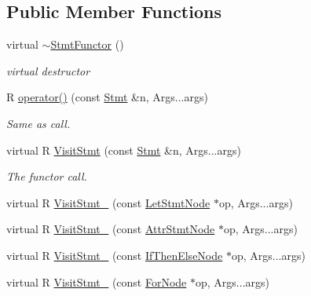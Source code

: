 \subsection*{Public Member Functions}
\begin{DoxyCompactItemize}
\item 
virtual \hyperlink{classtvm_1_1tir_1_1StmtFunctor_3_01R_07const_01Stmt_01_6n_00_01Args_8_8_8args_08_4_ada86a6f45feefbd47308a5cc5119067e}{$\sim$\+Stmt\+Functor} ()
\begin{DoxyCompactList}\small\item\em virtual destructor \end{DoxyCompactList}\item 
R \hyperlink{classtvm_1_1tir_1_1StmtFunctor_3_01R_07const_01Stmt_01_6n_00_01Args_8_8_8args_08_4_abe503254d07c1270000335d02c6f98b4}{operator()} (const \hyperlink{classtvm_1_1tir_1_1Stmt}{Stmt} \&n, Args...\+args)
\begin{DoxyCompactList}\small\item\em Same as call. \end{DoxyCompactList}\item 
virtual R \hyperlink{classtvm_1_1tir_1_1StmtFunctor_3_01R_07const_01Stmt_01_6n_00_01Args_8_8_8args_08_4_a681fd33e837008d7f2534d206bdacca3}{Visit\+Stmt} (const \hyperlink{classtvm_1_1tir_1_1Stmt}{Stmt} \&n, Args...\+args)
\begin{DoxyCompactList}\small\item\em The functor call. \end{DoxyCompactList}\item 
virtual R \hyperlink{classtvm_1_1tir_1_1StmtFunctor_3_01R_07const_01Stmt_01_6n_00_01Args_8_8_8args_08_4_a4ae20a46aa6a7fdeec5f7ae30935b8ca}{Visit\+Stmt\+\_\+} (const \hyperlink{classtvm_1_1tir_1_1LetStmtNode}{Let\+Stmt\+Node} $\ast$op, Args...\+args)
\item 
virtual R \hyperlink{classtvm_1_1tir_1_1StmtFunctor_3_01R_07const_01Stmt_01_6n_00_01Args_8_8_8args_08_4_a6c7fee50ff8c15f95228d8edff19a39f}{Visit\+Stmt\+\_\+} (const \hyperlink{classtvm_1_1tir_1_1AttrStmtNode}{Attr\+Stmt\+Node} $\ast$op, Args...\+args)
\item 
virtual R \hyperlink{classtvm_1_1tir_1_1StmtFunctor_3_01R_07const_01Stmt_01_6n_00_01Args_8_8_8args_08_4_a77331d93b2c3f54b007918bcfb57a941}{Visit\+Stmt\+\_\+} (const \hyperlink{classtvm_1_1tir_1_1IfThenElseNode}{If\+Then\+Else\+Node} $\ast$op, Args...\+args)
\item 
virtual R \hyperlink{classtvm_1_1tir_1_1StmtFunctor_3_01R_07const_01Stmt_01_6n_00_01Args_8_8_8args_08_4_a5aac298853219524d70e89b6a8672cf7}{Visit\+Stmt\+\_\+} (const \hyperlink{classtvm_1_1tir_1_1ForNode}{For\+Node} $\ast$op, Args...\+args)

\end{DoxyCompactItemize}
